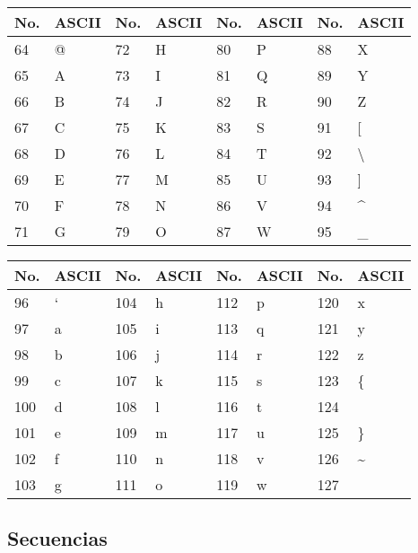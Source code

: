 \documentclass[10pt,landscape,twocolumn,letterpaper,twosided]{article}
\begin{document}
{{			\begin{tabular}{|l|l|l|l|l|l|l|l|}
				\hline \textbf{No.} & \textbf{ASCII} & \textbf{No.} & \textbf{ASCII}  &
					\textbf{No.} & \textbf{ASCII} & \textbf{No.} & \textbf{ASCII} \\ \hline
				64 & @ & 72 & H & 80 & P & 88 & X \\ \hline
				65 & A & 73 & I & 81 & Q & 89 & Y \\ \hline
				66 & B & 74 & J & 82 & R & 90 & Z \\ \hline
				67 & C & 75 & K & 83 & S & 91 & [ \\ \hline
				68 & D & 76 & L & 84 & T & 92 & \textbackslash \\ \hline
				69 & E & 77 & M & 85 & U & 93 & ] \\ \hline
				70 & F & 78 & N & 86 & V & 94 & \textasciicircum \\ \hline
				71 & G & 79 & O & 87 & W & 95 & \_ \\ \hline
			\end{tabular}
		
			\begin{tabular}{|l|l|l|l|l|l|l|l|}
				\hline \textbf{No.} & \textbf{ASCII} & \textbf{No.} & \textbf{ASCII}  &
					\textbf{No.} & \textbf{ASCII} & \textbf{No.} & \textbf{ASCII} \\ \hline
				96 & ` & 104 & h & 112 & p & 120 & x \\ \hline
				97 & a & 105 & i & 113 & q & 121 & y \\ \hline
				98 & b & 106 & j & 114 & r & 122 & z \\ \hline
				99 & c & 107 & k & 115 & s & 123 & \{ \\ \hline
				100 & d & 108 & l & 116 & t & 124 & \textbar \\ \hline
				101 & e & 109 & m & 117 & u & 125 & \} \\ \hline
				102 & f & 110 & n & 118 & v & 126 & \textasciitilde \\ \hline
				103 & g &  111 & o & 119 & w & 127 &  \\ \hline
			\end{tabular}
			
				\subsection{Secuencias}
						
}}
\end{document}
